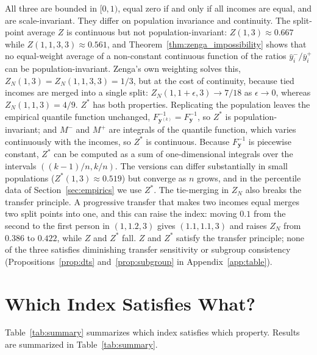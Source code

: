 \documentclass[12pt]{article}
\theoremstyle{plain}
\theoremstyle{definition}
\theoremstyle{remark}
\newcommand{\bfy}{\mathbf{y}}
\begin{document}
All three are bounded in $[0, 1)$, equal zero if and only if all incomes are equal, and are scale-invariant.
They differ on population invariance and continuity.
The split-point average $Z$ is continuous but not population-invariant: $Z(1, 3) \approx 0.667$ while $Z(1, 1, 3, 3) \approx 0.561$, and Theorem~\ref{thm:zenga_impossibility} shows that no equal-weight average of a non-constant continuous function of the ratios $\bar{y}^{-}_i/\bar{y}^{+}_i$ can be population-invariant.
Zenga's own weighting solves this, $Z_N(1, 3) = Z_N(1, 1, 3, 3) = 1/3$, but at the cost of continuity, because tied incomes are merged into a single split: $Z_N(1, 1 + \epsilon, 3) \to 7/18$ as $\epsilon \to 0$, whereas $Z_N(1, 1, 3) = 4/9$.
$Z^*$ has both properties.
Replicating the population leaves the empirical quantile function unchanged, $F^{-1}_{\bfy^{(k)}} = F^{-1}_{\bfy}$, so $Z^*$ is population-invariant; and $M^{-}$ and $M^{+}$ are integrals of the quantile function, which varies continuously with the incomes, so $Z^*$ is continuous.
Because $F^{-1}_{\bfy}$ is piecewise constant, $Z^*$ can be computed as a sum of one-dimensional integrals over the intervals $((k-1)/n, k/n)$.
The versions can differ substantially in small populations ($Z^*(1, 3) \approx 0.519$) but converge as $n$ grows, and in the percentile data of Section~\ref{sec:empirics} we use $Z^*$.
The tie-merging in $Z_N$ also breaks the transfer principle.
A progressive transfer that makes two incomes equal merges two split points into one, and this can raise the index: moving $0.1$ from the second to the first person in $(1, 1.2, 3)$ gives $(1.1, 1.1, 3)$ and raises $Z_N$ from $0.386$ to $0.422$, while $Z$ and $Z^*$ fall.
$Z$ and $Z^*$ satisfy the transfer principle; none of the three satisfies diminishing transfer sensitivity or subgroup consistency (Propositions~\ref{prop:dts} and~\ref{prop:subgroup} in Appendix~\ref{app:table}).

\section{Which Index Satisfies What?}\label{sec:evaluation}

Table~\ref{tab:summary} summarizes which index satisfies which property.
Results are summarized in Table~\ref{tab:summary}.
\end{document}

